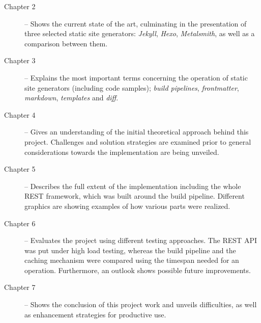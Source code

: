 \begin{description}
  \item[Chapter 2] -- Shows the current state of the art, culminating in the presentation of three selected static site generators: \emph{Jekyll}, \emph{Hexo}, \emph{Metalsmith}, as well as a comparison between them.
  \item[Chapter 3] -- Explains the most important terms concerning the operation of static site generators (including code samples); \emph{build pipelines}, \emph{frontmatter}, \emph{markdown}, \emph{templates} and \emph{diff}.
  \item[Chapter 4] -- Gives an understanding of the initial theoretical approach behind this project. Challenges and solution strategies are examined prior to general considerations towards the implementation are being unveiled.
  \item[Chapter 5] -- Describes the full extent of the implementation including the whole REST framework, which was built around the build pipeline. Different graphics are showing examples of how various parts were realized.
  \item[Chapter 6] -- Evaluates the project using different testing approaches. The REST API was put under high load testing, whereas the build pipeline and the caching mechanism were compared using the timespan needed for an operation. Furthermore, an outlook shows possible future improvements.
  \item[Chapter 7] -- Shows the conclusion of this project work and unveils difficulties, as well as enhancement strategies for productive use.
\end{description}





